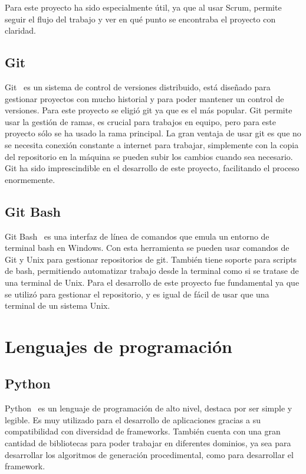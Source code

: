 Para este proyecto ha sido especialmente útil, ya que al usar Scrum, permite seguir el flujo del trabajo y ver en qué punto se encontraba el proyecto con claridad.

\subsection{Git}
Git~\cite{git} es un sistema de control de versiones distribuido, está diseñado para gestionar proyectos con mucho historial y para poder mantener un control de versiones.
Para este proyecto se eligió git ya que es el más popular. Git permite usar la gestión de ramas, es crucial para trabajos en equipo, pero para este proyecto sólo se ha usado la rama principal. La gran ventaja de usar git es que no se necesita conexión constante a internet para trabajar, simplemente con la copia del repositorio en la máquina se pueden subir los cambios cuando sea necesario. 
Git ha sido imprescindible en el desarrollo de este proyecto, facilitando el proceso enormemente.

\subsection{Git Bash}
Git Bash~\cite{gitbash} es una interfaz de línea de comandos que emula un entorno de terminal bash en Windows. Con esta herramienta se pueden usar comandos de Git y Unix para gestionar repositorios de git. 
También tiene soporte para scripts de bash, permitiendo automatizar trabajo desde la terminal como si se tratase de una terminal de Unix. 
Para el desarrollo de este proyecto fue fundamental ya que se utilizó para gestionar el repositorio, y es igual de fácil de usar que una terminal de un sistema Unix.


\section{Lenguajes de programación}
\subsection{Python}
Python~\cite{python} es un lenguaje de programación de alto nivel, destaca por ser simple y legible. Es muy utilizado para el desarrollo de aplicaciones gracias a su compatibilidad con diversidad de frameworks. También cuenta con una gran cantidad de bibliotecas para poder trabajar en diferentes dominios, ya sea para desarrollar los algoritmos de generación procedimental, como para desarrollar el framework.

